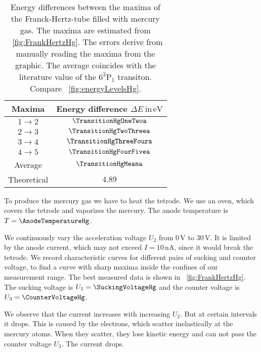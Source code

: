 \documentclass[a4paper,10pt,twocolumn]{article}
\newcommand{\volt}{\, \mathrm{V}}
\newcommand{\eV}{\, \mathrm{eV}}
\newcommand{\HgLevelA}{6^3\mathrm{P}_1}
\newcommand{\TheoreticalTransitionHga}{4.89}
\begin{document}
    \begin{table}[httb]
        \centering
        \begin{tabular}{c c}
            \hline \hline 
            Maxima & Energy difference $\Delta E \ \mathrm{in} \eV$ \\
            \hline
            $1 \rightarrow 2$ & $\TransitionHgOneTwoa$ \\
            $2 \rightarrow 3$ & $\TransitionHgTwoThreea$ \\
            $3 \rightarrow 4$ & $\TransitionHgThreeFoura$\\
            $4 \rightarrow 5$ & $\TransitionHgFourFivea$\\
            \hline
            Average & $\TransitionHgMeana$\\
            Theoretical & $\TheoreticalTransitionHga$ \\
            \hline 
            \hline
        \end{tabular}
        \caption{Energy differences between the maxima of the Franck-Hertz-tube filled with mercury gas.
        The maxima are estimated from ~\autoref{fig:FrankHertzHg}.
        The errors derive from manually reading the maxima from the graphic.
        The average coincides with the literature value of the $\HgLevelA$ transiton.
        Compare ~\autoref{fig:energyLevelsHg}.}
        \label{tab:transitionHg}
    \end{table}
    
    To produce the mercury gas we have to heat the tetrode.
    We use an oven, which covers the tetrode and vaporizes the mercury.
    The anode temperature is $T = \AnodeTemperatureHg$.
    
    We continuously vary the acceleration voltage $U_2$ from $0\volt$ to $30\volt$.
    It is limited by the anode current, which 
    may not exceed $I = 10 \, \mathrm{nA}$, since it would break the tetrode.
    We record characteristic curves for different pairs of sucking and counter voltage, to
    find a curve with sharp maxima inside the confines of our measurement range.
    The best measured data is shown in ~\autoref{fig:FrankHertzHg}.
    The sucking voltage is $U_1 = \SuckingVoltageHg$ and the counter voltage is $U_3 = \CounterVoltageHg$.
    
    We observe that the current increases with increasing $U_2$.
    But at certain intervals it drops.
    This is caused by the electrons, which scatter inelastically at the mercury atoms.
    When they scatter, they lose kinetic energy and can not pass the counter voltage $U_3$.
    The current drops.
    
\end{document}
